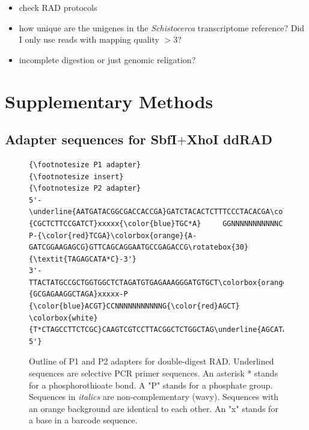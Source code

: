 \documentclass[a4paper,12pt,times,print,index,custombib,custommargin]{PhDThesisPSnPDF}\usepackage[]{graphicx}\usepackage[]{color}
\begin{document}
\begin{itemize}
\item check RAD protocols
\item how unique are the unigenes in the \textit{Schistocerca} transcriptome reference? Did I only use reads with mapping quality $>$3?
\item incomplete digestion or just genomic religation?
\end{itemize}

\section{Supplementary Methods}

\subsection{Adapter sequences for SbfI$+$XhoI ddRAD}\label{ch:adapter_sequences}

\begin{figure}[h]
\begin{Verbatim}[fontfamily=courier, fontsize=\relsize{-7}, commandchars=\\\{\}, frame=single, framesep=10pt, label=P1 and P2 adapters for ddRAD]
          {\footnotesize P1 adapter}                                        {\footnotesize insert}                                   {\footnotesize P2 adapter}
5'-\underline{AATGATACGGCGACCACCGA}GATCTACACTCTTTCCCTACACGA\colorbox{white}{CGCTCTTCCGATCT}xxxxx{\color{blue}TGC*A}     GGNNNNNNNNNNNC     P-{\color{red}TCGA}\colorbox{orange}{A-GATCGGAAGAGCG}GTTCAGCAGGAATGCCGAGACCG\rotatebox{30}{\textit{TAGAGCATA*C}-3'}
3'-TTACTATGCCGCTGGTGGCTCTAGATGTGAGAAAGGGATGTGCT\colorbox{orange}{GCGAGAAGGCTAGA}xxxxx-P    {\color{blue}ACGT}CCNNNNNNNNNNNG{\color{red}AGCT}       \colorbox{white}{T*CTAGCCTTCTCGC}CAAGTCGTCCTTACGGCTCTGGCTAG\underline{AGCATACGGCAGAAGACGAAC-5'}
\end{Verbatim}
\caption{Outline of P1 and P2 adapters for double-digest RAD. Underlined sequences are selective PCR primer sequences. An asterisk * stands for a phosphorothioate bond. A "P" stands for a phosphate group. Sequences in \textit{italics} are non-complementary (wavy). Sequences with an orange background are identical to each other. An "x" stands for a base in a barcode sequence.}
\label{adapter_outline} %
\end{figure}
\end{document}
